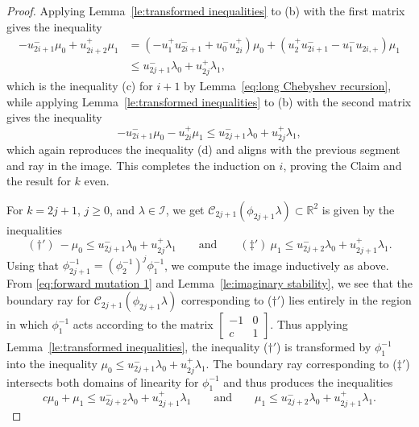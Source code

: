 \documentclass[pdflatex,sn-mathphys]{sn-jnl}%
\theoremstyle{thmstyleone}%
\theoremstyle{thmstyletwo}%
\theoremstyle{thmstylethree}%
\newcommand{\cC}{\mathcal{C}}
\newcommand{\cI}{\mathcal{I}}
\newcommand{\RR}{\mathbb{R}}
\begin{document}
\begin{proof}
    Applying Lemma~\ref{le:transformed inequalities} to (b) with the first matrix gives the inequality 
    \begin{align*}
      -u_{2i+1}^-\mu_0+u_{2i+2}^+\mu_1
      &=(-u_1^+u_{2i+1}^-+u_0^-u_{2i}^+)\mu_0+(u_2^+u_{2i+1}^--u_1^-u_{2i,+})\mu_1\\
      &\le u_{2j+1}^-\lambda_0+u_{2j}^+\lambda_1,
    \end{align*}
    which is the inequality (c) for $i+1$ by Lemma~\ref{eq:long Chebyshev recursion}, while applying Lemma~\ref{le:transformed inequalities} to (b) with the second matrix gives the inequality 
    \[-u_{2i+1}^-\mu_0-u_{2i}^+\mu_1\le u_{2j+1}^-\lambda_0+u_{2j}^+\lambda_1,\]
    which again reproduces the inequality (d) and aligns with the previous segment and ray in the image.
    This completes the induction on $i$, proving the Claim and the result for $k$ even.

    For $k=2j+1$, $j\ge0$, and $\lambda\in\cI$, we get $\cC_{2j+1}(\phi_{2j+1}\lambda)\subset\RR^2$ is given by the inequalities 
    \[ (\dagger')\ -\mu_0\le u_{2j+1}^-\lambda_0+u_{2j}^+\lambda_1 \qquad\text{and}\qquad (\ddagger')\ \mu_1\le u_{2j+2}^-\lambda_0+u_{2j+1}^+\lambda_1.\]
    Using that $\phi_{2j+1}^{-1}=\left(\phi_2^{-1}\right)^j\phi_1^{-1}$, we compute the image inductively as above.
    From \eqref{eq:forward mutation 1} and Lemma~\ref{le:imaginary stability}, we see that the boundary ray for $\cC_{2j+1}(\phi_{2j+1}\lambda)$ corresponding to ($\dagger'$) lies entirely in the region in which $\phi_1^{-1}$ acts according to the matrix $\left[ \begin{array}{cc} -1 & 0\\ c & 1 \end{array}\right]$.
    Thus applying Lemma~\ref{le:transformed inequalities}, the inequality ($\dagger'$) is transformed by $\phi_1^{-1}$ into the inequality $\mu_0\le u_{2j+1}^-\lambda_0+u_{2j}^+\lambda_1$.
    The boundary ray corresponding to ($\ddagger'$) intersects both domains of linearity for $\phi_1^{-1}$ and thus produces the inequalities
    \[ c\mu_0+\mu_1\le u_{2j+2}^-\lambda_0+u_{2j+1}^+\lambda_1 \qquad\text{and}\qquad \mu_1\le u_{2j+2}^-\lambda_0+u_{2j+1}^+\lambda_1.\]


\end{proof}
\end{document}
